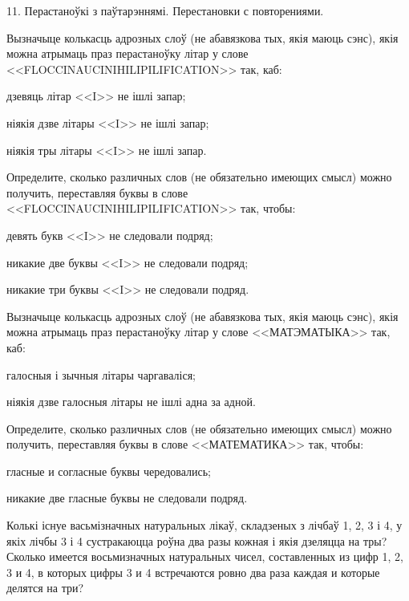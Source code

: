 \documentclass[12pt, a4paper]{article}
\begin{document}
\biLangHeader
{11. Перастаноўкі з паўтарэннямі.}
{Перестановки с повторениями.}

\begin{problemList}

\problemItemSimple
{%
Вызначыце колькасць адрозных слоў (не абавязкова тых, якія маюць сэнс), якія можна атрымаць
праз перастаноўку літар у слове <<FLOCCINAUCINIHILIPILIFICATION>> так, каб:
\begin{belarusianEnumerate}
    \item дзевяць літар <<I>> не ішлі запар;
    \item ніякія дзве літары <<I>> не ішлі запар;
    \item ніякія тры літары <<I>> не ішлі запар.
\end{belarusianEnumerate}
}
{%
Определите, сколько различных слов (не обязательно имеющих смысл) можно
получить, переставляя буквы в слове <<FLOCCINAUCINIHILIPILIFICATION>>
так, чтобы:
\begin{russianEnumerate}
    \item девять букв <<I>> не следовали подряд;
    \item никакие две буквы <<I>> не следовали подряд;
    \item никакие три буквы <<I>> не следовали подряд.
\end{russianEnumerate}
}

\bigskip

\problemItemSimple
{%
Вызначыце колькасць адрозных слоў (не абавязкова тых, якія маюць сэнс), якія можна атрымаць
праз перастаноўку літар у слове <<МАТЭМАТЫКА>> так, каб:
\begin{belarusianEnumerate}
    \item галосныя і зычныя літары чаргаваліся;
    \item ніякія дзве галосныя літары не ішлі адна за адной.
\end{belarusianEnumerate}
}
{%
Определите, сколько различных слов (не обязательно имеющих смысл) можно
получить, переставляя буквы в слове <<МАТЕМАТИКА>>
так, чтобы:
\begin{russianEnumerate}
    \item гласные и согласные буквы чередовались;
    \item никакие две гласные буквы не следовали подряд.
\end{russianEnumerate}
}

\bigskip

\problemItemSimple
{Колькі існуе васьмізначных натуральных лікаў, складзеных з лічбаў 1, 2, 3 і 4,
у якіх лічбы 3 і 4 сустракаюцца роўна два разы кожная і якія дзеляцца на тры?}
{Сколько имеется восьмизначных натуральных чисел, составленных
из цифр 1, 2, 3 и 4, в которых цифры 3 и 4 встречаются ровно
два раза каждая и которые делятся на три?}


\end{problemList}
\end{document}
